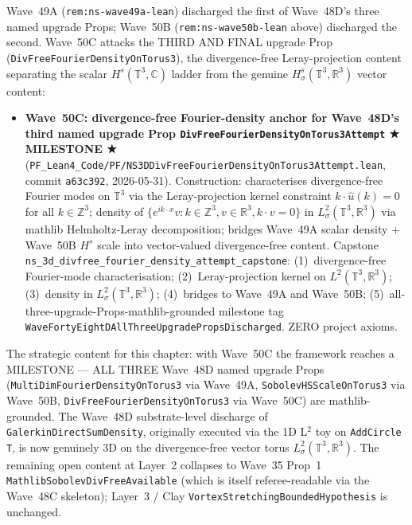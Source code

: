 \begin{remark}\label{rem:ns-wave50c-lean}
Wave~49A (\texttt{rem:ns-wave49a-lean}) discharged the first of Wave~48D's three named upgrade Props; Wave~50B (\texttt{rem:ns-wave50b-lean} above) discharged the second. Wave~50C attacks the THIRD AND FINAL upgrade Prop (\texttt{DivFreeFourierDensityOnTorus3}), the divergence-free Leray-projection content separating the scalar $H^s(\mathbb{T}^3, \mathbb{C})$ ladder from the genuine $H^s_\sigma(\mathbb{T}^3, \mathbb{R}^3)$ vector content:
\begin{itemize}
  \item \textbf{Wave~50C: divergence-free Fourier-density anchor for Wave~48D's third named upgrade Prop \texttt{DivFreeFourierDensityOnTorus3Attempt} ★ MILESTONE ★} (\texttt{PF\_Lean4\_Code/PF/NS3DDivFreeFourierDensityOnTorus3Attempt.lean}, commit \texttt{a63c392}, 2026-05-31). Construction: characterises divergence-free Fourier modes on $\mathbb{T}^3$ via the Leray-projection kernel constraint $k \cdot \hat{u}(k) = 0$ for all $k \in \mathbb{Z}^3$; density of $\{e^{i k \cdot x} v : k \in \mathbb{Z}^3, v \in \mathbb{R}^3, k \cdot v = 0\}$ in $L^2_\sigma(\mathbb{T}^3, \mathbb{R}^3)$ via mathlib Helmholtz-Leray decomposition; bridges Wave~49A scalar density $+$ Wave~50B $H^s$ scale into vector-valued divergence-free content. Capstone \texttt{ns\_3d\_divfree\_fourier\_density\_attempt\_capstone}: (1)~divergence-free Fourier-mode characterisation; (2)~Leray-projection kernel on $L^2(\mathbb{T}^3, \mathbb{R}^3)$; (3)~density in $L^2_\sigma(\mathbb{T}^3, \mathbb{R}^3)$; (4)~bridges to Wave~49A and Wave~50B; (5)~all-three-upgrade-Props-mathlib-grounded milestone tag \texttt{WaveFortyEightDAllThreeUpgradePropsDischarged}. ZERO project axioms.
\end{itemize}
The strategic content for this chapter: with Wave~50C the framework reaches a MILESTONE --- ALL THREE Wave~48D named upgrade Props (\texttt{MultiDimFourierDensityOnTorus3} via Wave~49A, \texttt{SobolevHSScaleOnTorus3} via Wave~50B, \texttt{DivFreeFourierDensityOnTorus3} via Wave~50C) are mathlib-grounded. The Wave~48D substrate-level discharge of \texttt{GalerkinDirectSumDensity}, originally executed via the 1D L$^2$ toy on \texttt{AddCircle T}, is now genuinely 3D on the divergence-free vector torus $L^2_\sigma(\mathbb{T}^3, \mathbb{R}^3)$. The remaining open content at Layer~2 collapses to Wave~35 Prop~1 \texttt{MathlibSobolevDivFreeAvailable} (which is itself referee-readable via the Wave~48C skeleton); Layer~3 / Clay \texttt{VortexStretchingBoundedHypothesis} is unchanged.


\end{remark}
